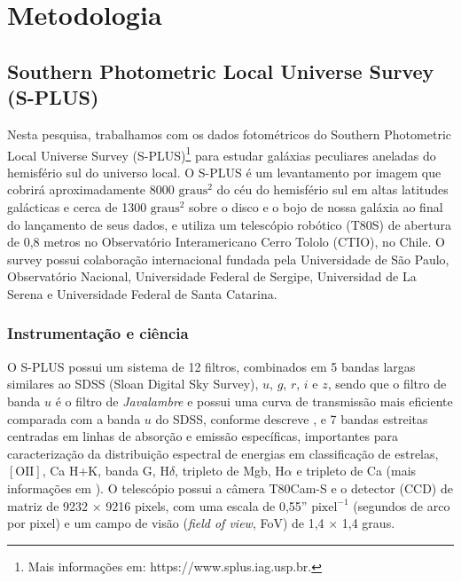 \chapter{Metodologia}
\label{chap:metodologia}

\section{Southern Photometric Local Universe Survey (S-PLUS)}
\label{sec:splus}

Nesta pesquisa, trabalhamos com os dados fotométricos do Southern Photometric Local Universe Survey (S-PLUS)\footnote{Mais informações em: https://www.splus.iag.usp.br.} para estudar galáxias peculiares aneladas do hemisfério sul do universo local. O S-PLUS é um levantamento por imagem que cobrirá aproximadamente 8000 $\mathrm{graus}^{2}$ do céu do hemisfério sul em altas latitudes galácticas e cerca de 1300 $\mathrm{graus}^{2}$ sobre o disco e o bojo de nossa galáxia ao final do lançamento de seus dados, e utiliza um telescópio robótico (T80S) de abertura de 0,8 metros no Observatório Interamericano Cerro Tololo (CTIO), no Chile. O survey possui colaboração internacional fundada pela Universidade de São Paulo, Observatório Nacional, Universidade Federal de Sergipe, Universidad de La Serena e Universidade Federal de Santa Catarina.

\subsection{Instrumentação e ciência}

O S-PLUS possui um sistema de 12 filtros, combinados em 5 bandas largas similares ao SDSS (Sloan Digital Sky Survey), $u$, $g$, $r$, $i$ e $z$, sendo que o filtro de banda $u$ é o filtro de \emph{Javalambre} e possui uma curva de transmissão mais eficiente comparada com a banda $u$ do SDSS, conforme descreve , e 7 bandas estreitas centradas em linhas de absorção e emissão específicas, importantes para caracterização da distribuição espectral de energias em classificação de estrelas, $[\text{OII}]$, Ca H+K, banda G, H$\delta$, tripleto de Mgb, H$\alpha$ e tripleto de Ca (mais informações em ). O telescópio possui a câmera T80Cam-S e o detector (CCD) de matriz de 9232 × 9216 pixels, com uma escala de 0,55'' $\mathrm{pixel}^{-1}$ (segundos de arco por pixel) e um campo de visão (\emph{field of view}, FoV) de 1,4 × 1,4 graus.

